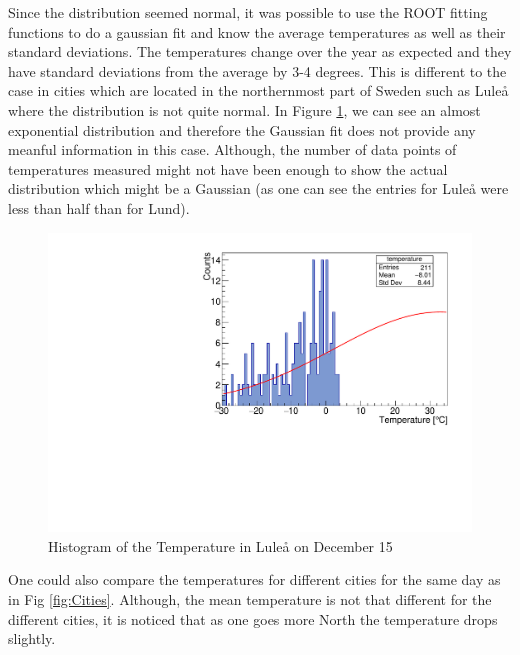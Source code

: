 \noindent Since the distribution seemed normal, it was possible to use the ROOT fitting functions to do a gaussian fit and know the average temperatures as well as their standard deviations. The temperatures change over the year as expected and they have standard deviations from the average by 3-4 degrees. This is different to the case in cities which are located in the northernmost part of Sweden such as Luleå where the distribution is not quite normal. In Figure \ref{LuleåTemp}, we can see an almost exponential distribution and therefore the Gaussian fit does not provide any meanful information in this case. Although, the number of data points of temperatures measured might not have been enough to show the actual distribution which might be a Gaussian (as one can see the entries for Luleå were less than half than for Lund).



\begin{figure}[H]
    \centering
    \includegraphics[scale=0.6]{Images/lulea_histogram.pdf}
    \caption{Histogram of the Temperature in Luleå on December 15}
    \label{LuleåTemp}
\end{figure}
One could also compare the temperatures for different cities for the same day as in Fig \ref{fig:Cities}. Although, the mean temperature is not that different for the different cities, it is noticed that as one goes more North the temperature drops slightly.


